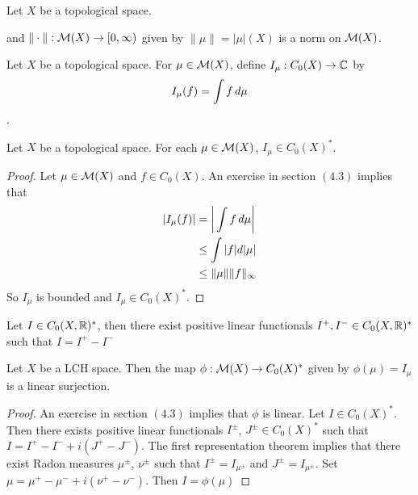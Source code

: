 \documentclass{book}
\begin{document}
	\begin{ex}
	Let $X$ be a topological space.
	
	and $\|\cdot\|: \mathcal{M}(X) \rightarrow [0,\infty)$ given by $\| \mu \| = |\mu|(X)$ is a norm on $\mathcal{M}(X)$. 
	\end{ex}		
	
	\begin{defn} \ld{00000} 
	Let $X$ be a topological space. For $\mu \in \mathcal{M}(X)$, define $I_{\mu} :C_0(X) \rightarrow \mathbb{C}$ by $$I_{\mu} (f) = \int f \, d \mu$$.
	\end{defn}
	
	\begin{ex}  
	Let $X$ be a topological space. For each $\mu \in \mathcal{M}(X)$, $I_\mu \in C_0(X)^*$.
	\end{ex}
	
	\begin{proof}
	Let $\mu \in \mathcal{M}(X)$ and $f \in C_0(X)$. An exercise in section $(4.3)$ implies that 
	\begin{align*}
	|I_{\mu}(f)| 
	&= \bigg| \int f \, d \mu \bigg| \\
	& \leq \int |f| d |\mu| \\
	& \leq \| \mu \| \|f\|_{\infty}
	\end{align*}
	So $I_{\mu}$ is bounded and $I_{\mu} \in C_0(X)^*$.
	\end{proof}
	
	\begin{thm}
	Let $I \in C_0(X, \mathbb{R})^*$, then there exist positive linear functionals $I^+, I^- \in C_0(X, \mathbb{R})^*$ such that $I = I^+ - I^-$
	\end{thm}
	
	\begin{ex}  
	Let $X$ be a LCH space. Then the map $ \phi: \mathcal{M}(X) \rightarrow C_0(X)^*$ given by $\phi(\mu) = I_{\mu}$ is a linear surjection.
	\end{ex}
	
	\begin{proof}
	An exercise in section $(4.3)$ implies that $\phi$ is linear. Let $I \in C_0(X)^*$. Then there exists positive linear functionals $I^{\pm}$, $J^{\pm} \in C_0(X)^*$ such that $I = I^+ - I^- + i(J^+ - J^-)$. The first representation theorem implies that there exist Radon measures $\mu^{\pm}$, $\nu^{\pm}$ such that $I^{\pm} = I_{\mu^{\pm}}$ and $J^{\pm} = I_{\mu^{\pm}}$. Set $\mu = \mu^+ - \mu^- +i(\nu^+ - \nu ^-)$. Then $I = \phi(\mu)$
	\end{proof}
	
\end{document}
